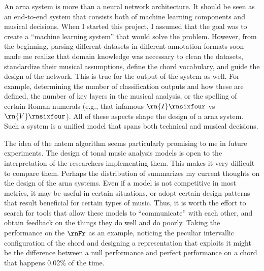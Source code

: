 
An \gls{arna} system is more than a neural network
architecture. It should be seen as an end-to-end system that
consists both of machine learning components and musical
decisions. When I started this project, I assumed that the
goal was to create a ``machine learning system'' that would
solve the problem. However, from the beginning, parsing
different datasets in different annotation formats soon made
me realize that domain knowledge was necessary to clean the
datasets, standardize their musical assumptions, define the
chord vocabulary, and guide the design of the network. This
is true for the output of the system as well. For example,
determining the number of classification outputs and how
these are defined, the number of key layers in the musical
analysis, or the spelling of certain Roman numerals (e.g.,
that infamous $\rn{I}\rnsixfour$ vs $\rn{V}\rnsixfour$). All
of these aspects shape the design of a \gls{arna} system.
Such a system is a unified model that spans both technical
and musical decisions.

The idea of the \gls{natem} algorithm seems particularly
promising to me in future experiments. The design of tonal
music analysis models is open to the interpretation of the
researchers implementing them. This makes it very difficult
to compare them. Perhaps the distribution of
 summarizes my current thoughts on the
design of the \gls{arna} systems. Even if a model is not
competitive in most metrics, it may be useful in certain
situations, or adopt certain design patterns that result
beneficial for certain types of music. Thus, it is worth the
effort to search for tools that allow these models to
``communicate'' with each other, and obtain feedback on the
things they do well and do poorly. Taking the performance on
the $\rnFr$ as an example, noticing the peculiar intervallic
configuration of the chord and designing a representation
that exploits it might be the difference between a null
performance and perfect performance on a chord that happens
0.02\% of the time.


